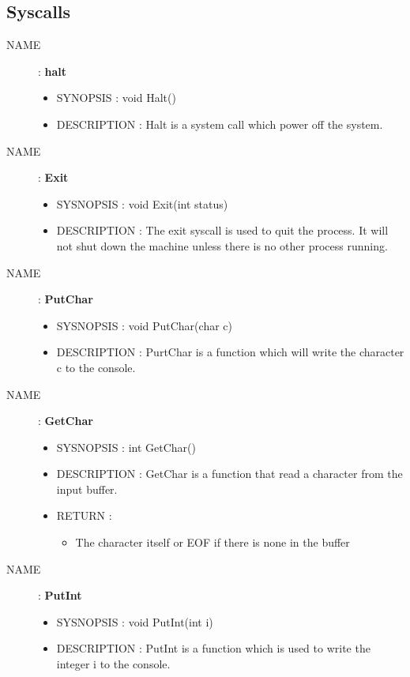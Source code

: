 \subsection{Syscalls}
\begin{description}
    \item [NAME] : \textbf{halt}
        \begin{itemize}
            \item SYNOPSIS : void Halt()
            \item DESCRIPTION :
                Halt is a system call which power off the system.
        \end{itemize}


    \item [NAME] : \textbf{Exit}
        \begin{itemize}
            \item SYSNOPSIS : void Exit(int status)
            \item DESCRIPTION :
                The exit syscall is used to quit the process. It will not shut down the
                machine unless there is no other process running.
        \end{itemize}

    \item [NAME] : \textbf{PutChar}
        \begin{itemize}
            \item SYSNOPSIS : void PutChar(char c)
            \item DESCRIPTION :
                PurtChar is a function which will write the character c to the console.
        \end{itemize}

    \item [NAME] : \textbf{GetChar}
        \begin{itemize}
            \item SYSNOPSIS : int GetChar()
            \item DESCRIPTION :
                GetChar is a function that read a character from the input buffer.
            \item RETURN :
                \begin{itemize}
                    \item The character itself or EOF if there is none in the buffer
                \end{itemize}
        \end{itemize}

    \item [NAME] : \textbf{PutInt}
        \begin{itemize}
            \item SYSNOPSIS : void PutInt(int i)
            \item DESCRIPTION :
                PutInt is a function which is used to write the integer i to the console.
        \end{itemize}


\end{description}

